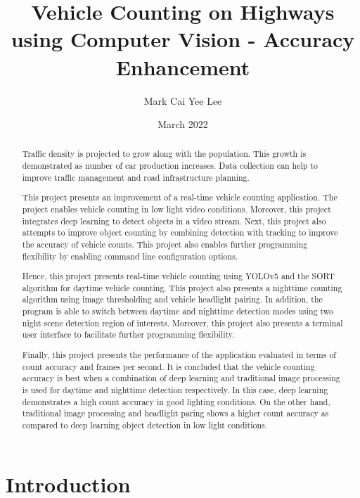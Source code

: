 \documentclass[12pt,a4paper,fleqn]{report}
\title{Vehicle Counting on Highways using Computer Vision - Accuracy Enhancement}
\author{Mark Cai Yee Lee}
\date{March 2022}
\begin{document}
\maketitle

\begin{abstract}
Traffic density is projected to grow along with the population.
This growth is demonstrated as number of car production increases.
Data collection can help to improve traffic management and road infrastructure planning.

This project presents an improvement of a real-time vehicle counting application.
The project enables vehicle counting in low light video conditions.
Moreover, this project integrates deep learning to detect objects in a video stream.
Next, this project also attempts to improve object counting by combining detection with tracking to
improve the accuracy of vehicle counts.
This project also enables further programming flexibility by enabling command line
configuration options.

Hence, this project presents real-time vehicle counting using YOLOv5 and the SORT algorithm for
daytime vehicle counting.
This project also presents a nighttime counting algorithm using image thresholding and vehicle
headlight pairing.
In addition, the program is able to switch between daytime and nighttime detection modes using two
night scene detection region of interests.
Moreover, this project also presents a terminal user interface to facilitate further programming
flexibility.

Finally, this project presents the performance of the application evaluated in terms of count
accuracy and frames per second.
It is concluded that the vehicle counting accuracy is best when a combination of deep learning and
traditional image processing is used for daytime and nighttime detection respectively.
In this case, deep learning demonstrates a high count accuracy in good lighting conditions.
On the other hand, traditional image processing and headlight paring shows a higher count accuracy
as compared to deep learning object detection in low light conditions.

\end{abstract}

\tableofcontents
\listoffigures
\begingroup
\let\clearpage\relax
\listoftables
\listoflistings
\endgroup

\chapter{Introduction}
\end{document}

